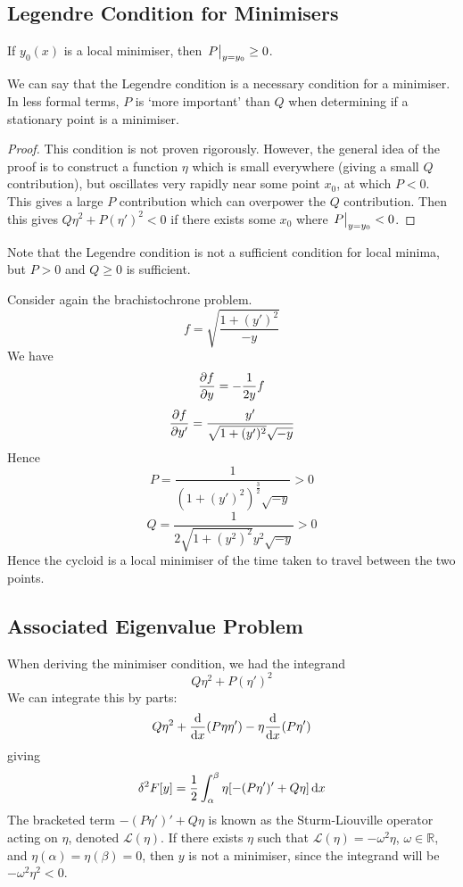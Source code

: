 \subsection{Legendre Condition for Minimisers}
\begin{proposition}
	If \( y_0(x) \) is a local minimiser, then \( \eval{P}_{y=y_0} \geq 0 \).
\end{proposition}
\noindent We can say that the Legendre condition is a necessary condition for a minimiser.
In less formal terms, \( P \) is `more important' than \( Q \) when determining if a stationary point is a minimiser.
\begin{proof}
	This condition is not proven rigorously.
	However, the general idea of the proof is to construct a function \( \eta \) which is small everywhere (giving a small \( Q \) contribution), but oscillates very rapidly near some point \( x_0 \), at which \( P < 0 \).
	This gives a large \( P \) contribution which can overpower the \( Q \) contribution.
	Then this gives \( Q\eta^2 + P(\eta')^2 < 0 \) if there exists some \( x_0 \) where \( \eval{P}_{y=y_0} < 0 \).
\end{proof}

\noindent Note that the Legendre condition is not a sufficient condition for local minima, but \( P > 0 \) and \( Q \geq 0 \) is sufficient.

\begin{example}
	Consider again the brachistochrone problem.
	\[
		f = \sqrt{\frac{1 + (y')^2}{-y}}
	\]
	We have
	\[
		\pdv{f}{y} = -\frac{1}{2y}f
	\]
	\[
		\pdv{f}{y'} = \frac{y'}{\sqrt{1+(y')^2}\sqrt{-y}}
	\]
	Hence
	\[
		P = \frac{1}{(1+(y')^2)^\frac{3}{2} \sqrt{-y}} > 0
	\]
	\[
		Q = \frac{1}{2\sqrt{1 + (y^2)^2}y^2 \sqrt{-y}} > 0
	\]
	Hence the cycloid is a local minimiser of the time taken to travel between the two points.
\end{example}

\subsection{Associated Eigenvalue Problem}
When deriving the minimiser condition, we had the integrand
\[
	Q\eta^2 + P(\eta')^2
\]
We can integrate this by parts:
\[
	Q\eta^2 + \dv{x} (P \eta \eta') - \eta \dv{x} (P \eta')
\]
giving
\[
	\delta^2 F[y] = \frac{1}{2}\int_\alpha^\beta \eta \qty[-(P\eta')' + Q\eta]\dd{x}
\]
The bracketed term \( -(P\eta')' + Q\eta \) is known as the Sturm-Liouville operator acting on \( \eta \), denoted \( \mathcal L(\eta) \).
If there exists \( \eta \) such that \( \mathcal L(\eta) = -\omega^2\eta \), \( \omega \in \mathbb R\), and \( \eta(\alpha) = \eta(\beta) = 0 \), then \( y \) is not a minimiser, since the integrand will be \( -\omega^2\eta^2 < 0 \).

